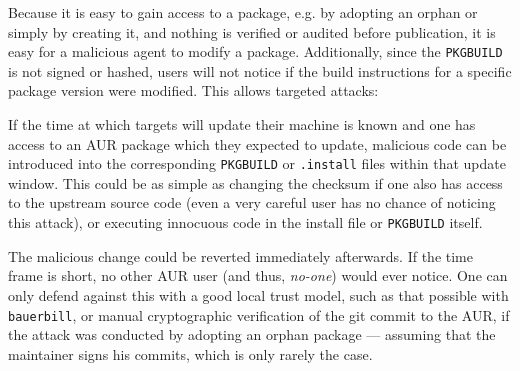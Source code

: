 Because it is easy to gain access to a package, e.g. by adopting an orphan or simply by creating it, and nothing is verified or audited before publication, it is easy for a malicious agent to modify a package.
Additionally, since the \texttt{PKGBUILD} is not signed or hashed, users will not notice if the build instructions for a specific package version were modified. This allows targeted attacks:

If the time at which targets will update their machine is known and one has access to an AUR package which they expected to update, malicious code can be introduced into the corresponding \texttt{PKGBUILD} or \texttt{.install} files within that update window.
This could be as simple as changing the checksum if one also has access to the upstream source code (even a very careful user has no chance of noticing this attack), or executing innocuous code in the install file or \texttt{PKGBUILD} itself.

The malicious change could be reverted immediately afterwards. If the time frame is short, no other AUR user (and thus, \emph{no-one}) would ever notice.
One can only defend against this with a good local trust model, such as that possible with \texttt{bauerbill}, or manual cryptographic verification of the git commit to the AUR, if the attack was conducted by adopting an orphan package --- assuming that the maintainer signs his commits, which is only rarely the case.
